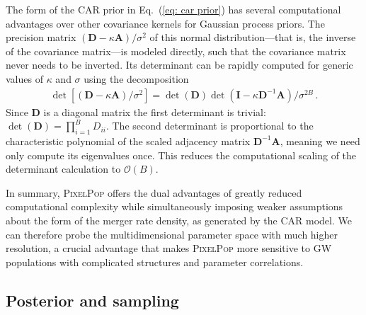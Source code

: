 \documentclass[%
reprint,
 amsmath,amssymb,
 aps,
 prd,nofootinbib,nobibnotes,
 superscriptaddress,groupedaddress,
]{revtex4-2}
\begin{document}
The form of the CAR prior in Eq.~(\ref{eq: car prior}) has several computational advantages over other covariance kernels for Gaussian process priors. The precision matrix $(\mathbf{D} - \kappa \mathbf{A}) / \sigma^2$ of this normal distribution---that is, the inverse of the covariance matrix---is modeled directly, such that the covariance matrix never needs to be inverted. Its determinant can be rapidly computed for generic values of $\kappa$ and $\sigma$ using the decomposition
\begin{align}
\det [ ( \mathbf{D} - \kappa \mathbf{A} ) / \sigma^2 ]
=
\det ( \mathbf{D} ) \det ( \mathbf{I} - \kappa \mathbf{D}^{-1} \mathbf{A} ) / \sigma^{2B}
\, .
\end{align}
Since $\mathbf{D}$ is a diagonal matrix the first determinant is trivial: $\det(\mathbf{D}) = \prod_{i=1}^B D_{ii}$. The second determinant is proportional to the characteristic polynomial of the scaled adjacency matrix $\mathbf{D}^{-1}\mathbf{A}$, meaning we need only compute its eigenvalues once. This reduces the computational scaling of the determinant calculation to $\mathcal{O}(B)$.

In summary, \textsc{PixelPop} offers the dual advantages of greatly reduced computational complexity while simultaneously imposing weaker assumptions about the form of the merger rate density, as generated by the CAR model. We can therefore probe the multidimensional parameter space with much higher resolution, a crucial advantage that makes \textsc{PixelPop} more sensitive to GW populations with complicated structures and parameter correlations.

\subsection{Posterior and sampling}
\label{sec: Posterior and sampling}
\end{document}
